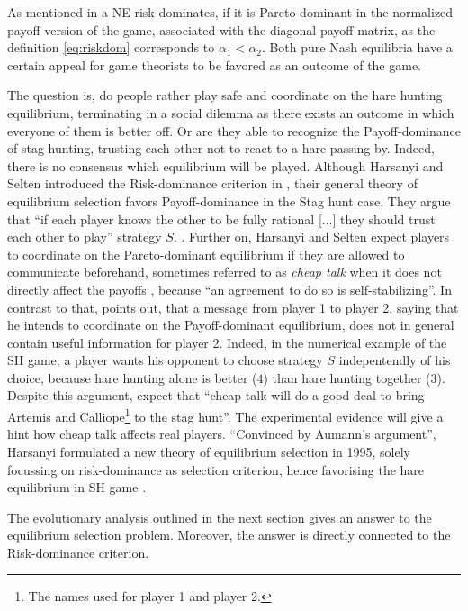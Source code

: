 As mentioned in \textcite{weibull_evolutionary_1997} a NE risk-dominates, 
if it is Pareto-dominant in the normalized payoff version of the game, 
associated with the diagonal payoff matrix, 
as the definition \eqref{eq:riskdom} corresponds to $\alpha_1 < \alpha_2$.
Both pure Nash equilibria have a certain appeal for game theorists to be
favored as an outcome of the game. 

The question is, do people rather play
safe and coordinate on the hare hunting equilibrium, terminating in a social
dilemma as there exists an outcome in which everyone of them is better off.
Or are they able to recognize the Payoff-dominance of stag hunting, 
trusting each other not to react to a hare passing by.
Indeed, there is no consensus which equilibrium will be played. 
Although Harsanyi and Selten introduced the Risk-dominance criterion in 
\textcite{harsanyi_general_1988}, their general theory of equilibrium 
selection favors Payoff-dominance in the Stag hunt case. They argue that
``if each player knows the other to be fully rational [...] they should trust
each other to play'' strategy $S$.
\parencite[89]{harsanyi_general_1988}.
Further on, Harsanyi and Selten expect players to coordinate on the
Pareto-dominant equilibrium if they are allowed to communicate beforehand,
sometimes referred to as \textit{cheap talk} when it does not directly affect
the payoffs \parencite[104]{farrell_cheap_1996}, 
because ``an agreement to do so is self-stabilizing''. 
In contrast to that,
\textcite{aumann_nash_1990} points out, that a message from player 1 to 
player 2, saying that he intends to coordinate on the Payoff-dominant 
equilibrium, does not in general contain useful information for player 2. 
Indeed, in the numerical example of the SH game, a player wants his
opponent to choose strategy $S$ indepentendly of his choice, because
hare hunting alone is better ($4$) than hare hunting together ($3$).
Despite this argument, 
\textcite[114]{farrell_cheap_1996} expect that 
``cheap talk will do a good deal to
bring Artemis and Calliope\footnote{The names
\textcite{farrell_cheap_1996} used for player 1 and player 2.} 
to the stag hunt''. The experimental evidence will give a hint how cheap
talk affects real players. 
``Convinced by Aumann's argument'', Harsanyi formulated a new theory
of equilibrium selection in 1995, solely focussing on 
risk-dominance as selection criterion, hence favorising the hare 
equilibrium in SH game \parencite[92,94,96]{harsanyi_new_1995}. 

The evolutionary analysis outlined in the next section gives an answer
to the equilibrium selection problem. Moreover, the answer is directly
connected to the Risk-dominance criterion.
